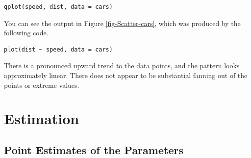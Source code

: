\documentclass[captions=tableheading]{scrbook}
\begin{document}
\begin{example}
\begin{verbatim}
qplot(speed, dist, data = cars)
\end{verbatim}





You can see the output in Figure \ref{fig-Scatter-cars}, which was produced by the following code.


\begin{verbatim}
plot(dist ~ speed, data = cars)
\end{verbatim}

There is a pronounced upward trend to the data points, and the pattern looks approximately linear. There does not appear to be substantial fanning out of the points or extreme values. 
\end{example}
\section{Estimation}
\label{sec-11-2}
\label{sec-SLR-Estimation}
\subsection{Point Estimates of the Parameters}
\label{sec-11-2-1}
\label{sub-point-estimate-mle-slr}
\end{document}
